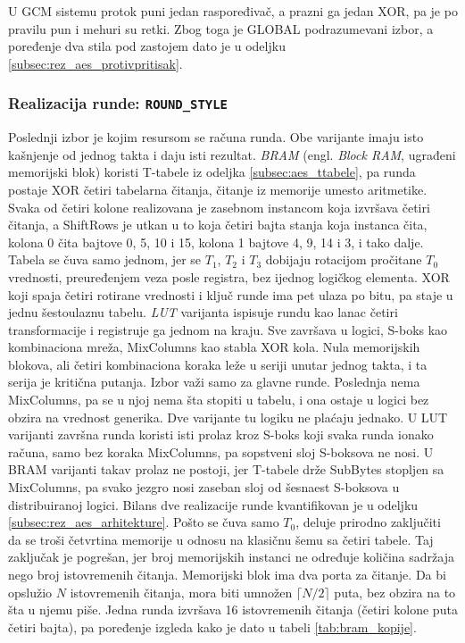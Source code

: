 U GCM sistemu protok puni jedan raspoređivač, a prazni ga jedan XOR, pa je po pravilu pun i mehuri su retki. Zbog toga je GLOBAL podrazumevani izbor, a poređenje dva stila pod zastojem dato je u odeljku \ref{subsec:rez_aes_protivpritisak}.

\subsubsection{Realizacija runde: \texttt{ROUND\_STYLE}}
\label{subsec:hw_aes_round_style}

Poslednji izbor je kojim resursom se računa runda. Obe varijante imaju isto kašnjenje od jednog takta i daju isti rezultat.
\smallbreak
\textit{BRAM} (engl. \textit{Block RAM}, ugrađeni memorijski blok) koristi T-tabele iz odeljka \ref{subsec:aes_ttabele}, pa runda postaje XOR četiri tabelarna čitanja, čitanje iz memorije umesto aritmetike. Svaka od četiri kolone realizovana je zasebnom instancom koja izvršava četiri čitanja, a ShiftRows je utkan u to koja četiri bajta stanja koja instanca čita, kolona 0 čita bajtove 0, 5, 10 i 15, kolona 1 bajtove 4, 9, 14 i 3, i tako dalje. Tabela se čuva samo jednom, jer se $T_1$, $T_2$ i $T_3$ dobijaju rotacijom pročitane $T_0$ vrednosti, preuređenjem veza posle registra, bez ijednog logičkog elementa. XOR koji spaja četiri rotirane vrednosti i ključ runde ima pet ulaza po bitu, pa staje u jednu šestoulaznu tabelu.
\smallbreak
\textit{LUT} varijanta ispisuje rundu kao lanac četiri transformacije i registruje ga jednom na kraju. Sve završava u logici, S-boks kao kombinaciona mreža, MixColumns kao stabla XOR kola. Nula memorijskih blokova, ali četiri kombinaciona koraka leže u seriji unutar jednog takta, i ta serija je kritična putanja.
\smallbreak
Izbor važi samo za glavne runde. Poslednja nema MixColumns, pa se u njoj nema šta stopiti u tabelu, i ona ostaje u logici bez obzira na vrednost generika. Dve varijante tu logiku ne plaćaju jednako. U LUT varijanti završna runda koristi isti prolaz kroz S-boks koji svaka runda ionako računa, samo bez koraka MixColumns, pa sopstveni sloj S-boksova ne nosi. U BRAM varijanti takav prolaz ne postoji, jer T-tabele drže SubBytes stopljen sa MixColumns, pa svako jezgro nosi zaseban sloj od šesnaest S-boksova u distribuiranoj logici. Bilans dve realizacije runde kvantifikovan je u odeljku \ref{subsec:rez_aes_arhitekture}.
\smallbreak
Pošto se čuva samo $T_0$, deluje prirodno zaključiti da se troši četvrtina memorije u odnosu na klasičnu šemu sa četiri tabele. Taj zaključak je pogrešan, jer broj memorijskih instanci ne određuje količina sadržaja nego broj istovremenih čitanja. Memorijski blok ima dva porta za čitanje. Da bi opslužio $N$ istovremenih čitanja, mora biti umnožen $\lceil N/2 \rceil$ puta, bez obzira na to šta u njemu piše.
\smallbreak
Jedna runda izvršava 16 istovremenih čitanja (četiri kolone puta četiri bajta), pa poređenje izgleda kako je dato u tabeli \ref{tab:bram_kopije}.

